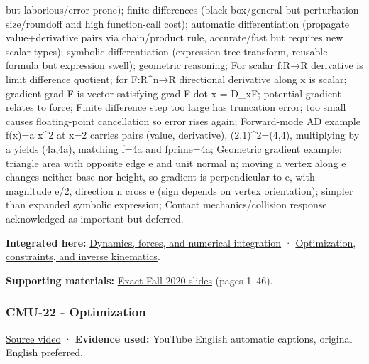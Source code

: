 but laborious/error-prone); finite differences (black-box/general but perturbation-size/roundoff and high function-call cost); automatic differentiation (propagate value+derivative pairs via chain/product rule, accurate/fast but requires new scalar types); symbolic differentiation (expression tree transform, reusable formula but expression swell); geometric reasoning; For scalar f:R→R derivative is limit difference quotient; for F:R\^{}n→R directional derivative along x is scalar; gradient grad F is vector satisfying grad F dot x = D\_xF; potential gradient relates to force; Finite difference step too large has truncation error; too small causes floating-point cancellation so error rises again; Forward-mode AD example f(x)=a x\^{}2 at x=2 carries pairs (value, derivative), (2,1)\^{}2=(4,4), multiplying by a yields (4a,4a), matching f=4a and fprime=4a; Geometric gradient example: triangle area with opposite edge e and unit normal n; moving a vertex along e changes neither base nor height, so gradient is perpendicular to e, with magnitude \textbar e\textbar/2, direction n cross e (sign depends on vertex orientation); simpler than expanded symbolic expression; Contact mechanics/collision response acknowledged as important but deferred.

\textbf{Integrated here:} \hyperref[04-visual-computing-ii-ch029-dynamics-forces-and-numerical-integration]{Dynamics, forces, and numerical integration} · \hyperref[04-visual-computing-ii-ch029-optimization-constraints-and-inverse-kinematics]{Optimization, constraints, and inverse kinematics}.

\textbf{Supporting materials:} \href{https://15462.courses.cs.cmu.edu/fall2020content/lectures/21_dynamicstimeintegration/21_dynamicstimeintegration_slides.pdf}{Exact Fall 2020 slides} (pages 1--46).

\subsubsection{CMU-22 - Optimization}\label{04-visual-computing-ii-ch036-cmu-22---optimization}

\href{https://www.youtube.com/watch?v=sDAEFFoiKZ0}{Source video} · \textbf{Evidence used:} YouTube English automatic captions, original English preferred.

